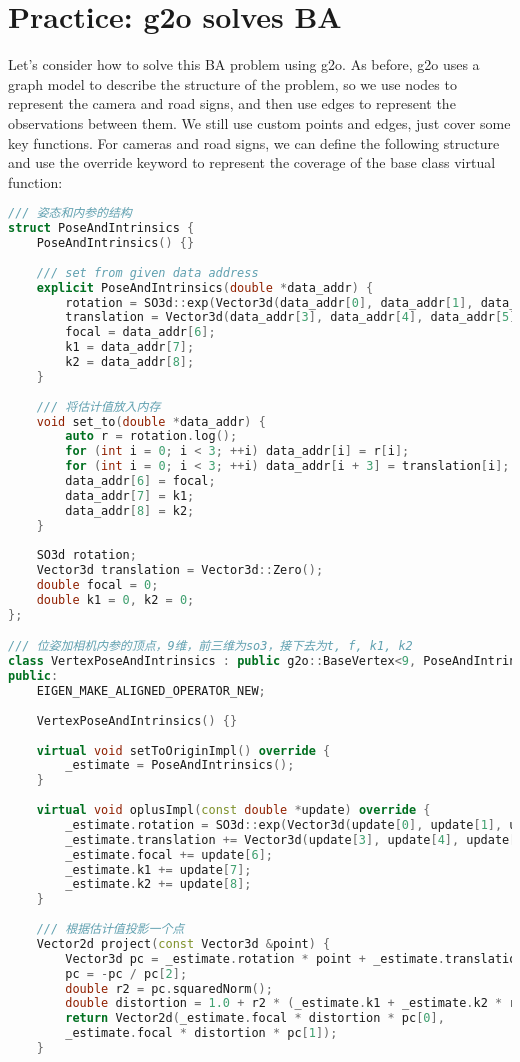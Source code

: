 \section{Practice: g2o solves BA}
Let's consider how to solve this BA problem using g2o. As before, g2o uses a graph model to describe the structure of the problem, so we use nodes to represent the camera and road signs, and then use edges to represent the observations between them. We still use custom points and edges, just cover some key functions. For cameras and road signs, we can define the following structure and use the override keyword to represent the coverage of the base class virtual function:
\begin{lstlisting}[language=c++,caption=slambook2/ch9/bundle_adjustment_g2o.cpp(fragment)]
/// 姿态和内参的结构
struct PoseAndIntrinsics {
	PoseAndIntrinsics() {}
	
	/// set from given data address
	explicit PoseAndIntrinsics(double *data_addr) {
		rotation = SO3d::exp(Vector3d(data_addr[0], data_addr[1], data_addr[2]));
		translation = Vector3d(data_addr[3], data_addr[4], data_addr[5]);
		focal = data_addr[6];
		k1 = data_addr[7];
		k2 = data_addr[8];
	}
	
	/// 将估计值放入内存
	void set_to(double *data_addr) {
		auto r = rotation.log();
		for (int i = 0; i < 3; ++i) data_addr[i] = r[i];
		for (int i = 0; i < 3; ++i) data_addr[i + 3] = translation[i];
		data_addr[6] = focal;
		data_addr[7] = k1;
		data_addr[8] = k2;
	}
	
	SO3d rotation;
	Vector3d translation = Vector3d::Zero();
	double focal = 0;
	double k1 = 0, k2 = 0;
};

/// 位姿加相机内参的顶点，9维，前三维为so3，接下去为t, f, k1, k2
class VertexPoseAndIntrinsics : public g2o::BaseVertex<9, PoseAndIntrinsics> {
public:
	EIGEN_MAKE_ALIGNED_OPERATOR_NEW;
	
	VertexPoseAndIntrinsics() {}
	
	virtual void setToOriginImpl() override {
		_estimate = PoseAndIntrinsics();
	}
	
	virtual void oplusImpl(const double *update) override {
		_estimate.rotation = SO3d::exp(Vector3d(update[0], update[1], update[2])) * _estimate.rotation;
		_estimate.translation += Vector3d(update[3], update[4], update[5]);
		_estimate.focal += update[6];
		_estimate.k1 += update[7];
		_estimate.k2 += update[8];
	}
	
	/// 根据估计值投影一个点
	Vector2d project(const Vector3d &point) {
		Vector3d pc = _estimate.rotation * point + _estimate.translation;
		pc = -pc / pc[2];
		double r2 = pc.squaredNorm();
		double distortion = 1.0 + r2 * (_estimate.k1 + _estimate.k2 * r2);
		return Vector2d(_estimate.focal * distortion * pc[0],
		_estimate.focal * distortion * pc[1]);
	}
	

\end{lstlisting}
